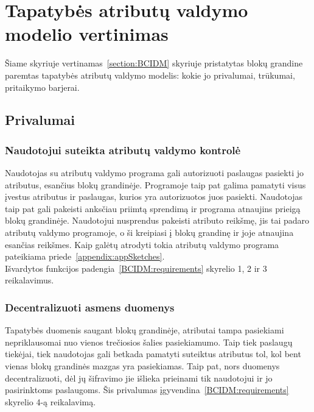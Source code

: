 \section{Tapatybės atributų valdymo modelio vertinimas} \label{section:blockchainIDMevaluation}

Šiame skyriuje vertinamas\hypertarget{section:BCIDM}{~\ref{section:BCIDM}} skyriuje pristatytas blokų grandine paremtas tapatybės atributų
valdymo modelis: kokie jo privalumai, trūkumai, pritaikymo barjerai.

\subsection{Privalumai}

\subsubsection{Naudotojui suteikta atributų valdymo kontrolė}

Naudotojas su atributų valdymo programa gali autorizuoti paslaugas pasiekti jo atributus, esančius blokų grandinėje. Programoje
taip pat galima pamatyti visus įvestus atributus ir paslaugas, kurios yra autorizuotos juos pasiekti. Naudotojas taip pat
gali pakeisti anksčiau priimtą sprendimą ir programa atnaujins prieigą blokų grandinėje. Naudotojui nusprendus pakeisti
atributo reikšmę, jis tai padaro atributų valdymo programoje, o ši kreipiasi į blokų grandinę ir joje atnaujina esančias reikšmes. Kaip
galėtų atrodyti tokia atributų valdymo programa pateikiama priede\hypertarget{appendix:appSketches}{~\ref{appendix:appSketches}}.\\
Išvardytos funkcijos padengia\hypertarget{BCIDM:requirements}{~\ref{BCIDM:requirements}} skyrelio 1, 2 ir 3 reikalavimus.

\subsubsection{Decentralizuoti asmens duomenys}

Tapatybės duomenis saugant blokų grandinėje, atributai tampa pasiekiami nepriklausomai nuo vienos trečiosios šalies pasiekiamumo.
Taip tiek paslaugų tiekėjai, tiek naudotojas gali betkada pamatyti suteiktus atributus tol, kol bent vienas blokų grandinės mazgas
yra pasiekiamas. Taip pat, nors duomenys decentralizuoti, dėl jų šifravimo jie išlieka prieinami tik naudotojui ir jo pasirinktoms
paslaugoms.
Šis privalumas įgyvendina\hypertarget{BCIDM:requirements}{~\ref{BCIDM:requirements}} skyrelio 4-ą reikalavimą.

